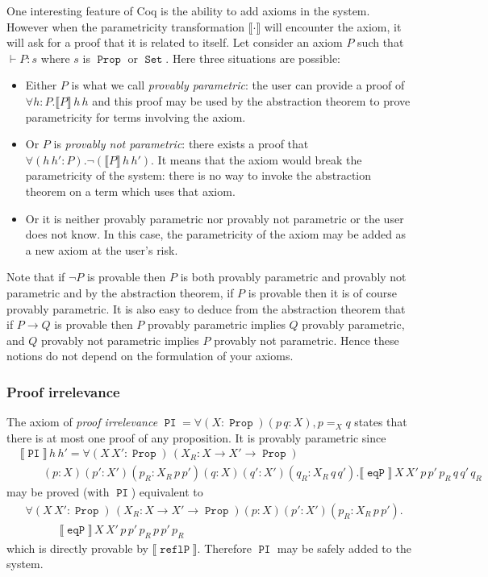 \documentclass[a4paper,USenglish]{lipics}
\DeclareMathOperator{\Prop}{\mathtt{Prop}}
\DeclareMathOperator{\Set}{\mathtt{Set}}
\DeclareMathOperator{\PI}{\mathtt{PI}}
\DeclareMathOperator{\EqP}{\mathtt{eqP}}
\DeclareMathOperator{\ReflP}{\mathtt{reflP}}
\def\coq{\textsf{Coq}\xspace}
\begin{document}
One interesting feature of \coq is the ability to add axioms in the
system. However when the parametricity transformation $⟦\cdot⟧$ will
encounter the axiom, it will ask for a proof that it is related to
itself. Let consider an axiom $P$ such that $⊢ P : s$ where $s$ is $\Prop$ or $\Set$.
Here three situations are possible:
\begin{itemize}
  \item Either $P$ is what we call \emph{provably parametric}: the user
   can provide a proof of $∀ h : P. ⟦P⟧\,h\,h$ and this proof may be used
   by the abstraction theorem to prove parametricity for terms involving
   the axiom.
  \item Or $P$ is \emph{provably not parametric}: there exists a proof
   that $∀ (h\,h' : P). ¬(⟦P⟧\,h\,h')$. It means that the axiom would break the
   parametricity of the system: there is no way to invoke the abstraction
   theorem on a term which uses that axiom.
  \item Or it is neither provably parametric nor provably not parametric
   or the user does not know. In this case, the parametricity of the
   axiom may be added as a new axiom at the user's risk.
\end{itemize}
Note that if $¬P$ is provable then $P$ is both provably parametric and
provably not parametric and by the abstraction theorem, if $P$ is provable
then it is of course provably parametric. It is also easy to deduce from the
abstraction theorem that if $P → Q$ is provable then
 $P$ provably parametric implies $Q$ provably parametric,
    and $Q$ provably not parametric implies $P$ provably not parametric.
Hence these notions do not depend on the formulation of your axioms.

\subsubsection{Proof irrelevance}\label{sec:examples:axioms:pi}

The axiom of \emph{proof irrelevance}
$\PI =  ∀ (X:\Prop)(p\,q : X), p =_X q$
states that there is at most one proof
of any proposition. It is provably parametric since
\begin{align*}
&⟦\PI⟧\,h\,h' =  ∀ (X\,X':\Prop)\,(X_R:X→ X'→ \Prop) \\
&\qquad  (p:X)(p':X')(p_R : X_R\,p\,p')
 (q:X)(q':X')(q_R : X_R\,q\,q'). ⟦\EqP⟧\,X\,X'\,p\,p'\,p_R\,q\,q'\,q_R
\end{align*}
may be proved (with $\PI$) equivalent to
\begin{align*}
& ∀ (X\,X':\Prop)\,(X_R:X→ X'→ \Prop)
  (p:X)(p':X')(p_R : X_R\,p\,p'). \\
& \qquad \quad ⟦\EqP⟧\,X\,X'\,p\,p'\,p_R\,p\,p'\,p_R
\end{align*}
which is directly provable by $⟦\ReflP⟧$.
Therefore $\PI$ may be safely added to the system.
\end{document}

